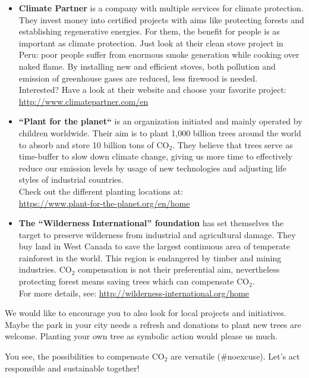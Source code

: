 \begin{itemize}
	\item 
	\textbf{Climate Partner} is a company with multiple services for climate protection.  They invest money into certified projects with aims like protecting forests and establishing regenerative energies. For them, the benefit for people is as important as climate protection. Just look at their clean stove project in Peru: poor people suffer from enormous smoke generation while cooking over naked flame. By installing new and efficient stoves, both pollution and emission of greenhouse gases are reduced, less firewood is needed. \\
	Interested? Have a look at their website and choose your favorite project: \\ \url{http://www.climatepartner.com/en}

	\item 
	\textbf{“Plant for the planet“} is an organization initiated and mainly operated by children worldwide. Their aim is to plant 1,000 billion trees around the world to absorb and store 10 billion tons of CO$_2$. They believe that trees serve as time-buffer to slow down climate change, giving us more time to effectively reduce our emission levels by usage of new technologies and adjusting life styles of industrial countries. \\
	Check out the different planting locations at: \\
	\url{https://www.plant-for-the-planet.org/en/home}

	\item 
	\textbf{The “Wilderness International” foundation} has set themselves the target to preserve wilderness from industrial and agricultural damage. They buy land in West Canada to save the largest continuous area of temperate rainforest in the world. This region is endangered by timber and mining industries. CO$_2$ compensation is not their preferential aim, nevertheless protecting forest means saving trees which can compensate CO$_2$. \\
	For more details, see: \url{http://wilderness-international.org/home} 
\end{itemize}



\begin{suggest}{}
	We would like to encourage you to also look for local projects and initiatives. Maybe the park in your city needs a refresh and donations to plant new trees are welcome. Planting your own tree as symbolic action would please us much.	
\end{suggest}


You see, the possibilities to compensate CO$_2$ are versatile (\#noexcuse). Let's act responsible and sustainable together!


